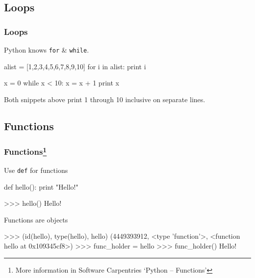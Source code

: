 \documentclass[xetex,10pt]{beamer}
\def\spacer{\vspace*{1em}}
\def\pythoni{\lstinline[language=pythontim]}
\begin{document}
\subsection{Loops}

\begin{frame}[fragile]
	\frametitle{Loops}
	Python knows \pythoni{for} \& \pythoni{while}.
	\spacer
	\pause

\begin{python}
alist = [1,2,3,4,5,6,7,8,9,10]
for i in alist:
    print i
\end{python}

	\spacer
	\pause

\begin{python}
x = 0
while x < 10:
    x = x + 1
    print x
\end{python}

	\spacer


Both snippets above print 1 through 10 inclusive on separate lines.

\end{frame}

\subsection{Functions}

\begin{frame}[fragile]
	\frametitle{Functions\footnote[frame]{More information in Software Carpentries `Python -- Functions'}}

	Use \pythoni{def} for functions
\pause

\begin{python}
def hello():
    print "Hello!"
\end{python}
\begin{python}
>>> hello()
Hello!
\end{python}

	\spacer
\pause

Functions are objects
\begin{python}
>>> (id(hello), type(hello), hello)
(4449393912, <type 'function'>, <function hello at 0x109345cf8>)
>>> func_holder = hello
>>> func_holder()
Hello!
\end{python}
\end{frame}
\end{document}
